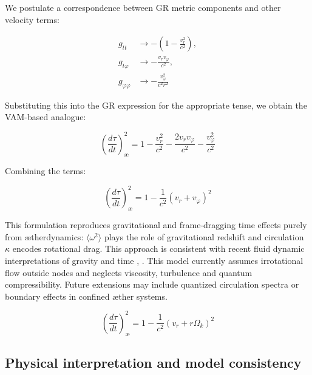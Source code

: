 We postulate a correspondence between GR metric components and other velocity terms:

\begin{equation}
 \begin{aligned}
  g_{tt} &\rightarrow -\left(1 - \frac{v_r^2}{c^2}\right), \\
  g_{t\varphi} &\rightarrow -\frac{v_r v_\varphi}{c^2}, \\
  g_{\varphi\varphi} &\rightarrow -\frac{v_\varphi^2}{c^2 r^2}
 \end{aligned}
 \label{eq:VAM_metric_terms}
\end{equation}

Substituting this into the GR expression for the appropriate tense, we obtain the VAM-based analogue:

\begin{equation}
 \left( \frac{d\tau}{dt} \right)^2_{\text{\ae}} = 1 - \frac{v_r^2}{c^2} - \frac{2v_r v_\varphi}{c^2} - \frac{v_\varphi^2}{c^2}
 \label{eq:VAM_proper_time}
\end{equation}

Combining the terms:

\begin{equation}
 \left( \frac{d\tau}{dt} \right)^2_{\text{\ae}} = 1 - \frac{1}{c^2}(v_r + v_\varphi)^2
 \label{eq:VAM_proper_time_combined}
\end{equation}

This formulation reproduces gravitational and frame-dragging time effects purely from ætherdynamics: $\langle \omega^2 \rangle$ plays the role of gravitational redshift and circulation $\kappa$ encodes rotational drag. This approach is consistent with recent fluid dynamic interpretations of gravity and time \cite{barcelo2011analogue}, \cite{fedi2017gravity}.
This model currently assumes irrotational flow outside nodes and neglects viscosity, turbulence and quantum compressibility. Future extensions may include quantized circulation spectra or boundary effects in confined æther systems.

\begin{equation}
 \boxed{\left( \frac{d\tau}{dt} \right)^2_{\text{\ae}} = 1 - \frac{1}{c^2}(v_r + r\Omega_k)^2}
 \label{eq:VAM_proper_time_final}
\end{equation}

\subsection{Physical interpretation and model consistency}

